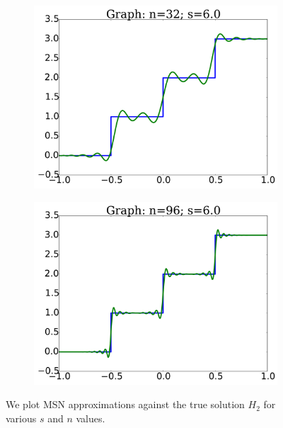 \begin{figure}[p]
    \begin{subfigure}{0.45\textwidth}
    \includegraphics[width=\textwidth]{plots/graph_n_32_s_6_heaviside_2.pdf}
    \end{subfigure}
    \begin{subfigure}{0.45\textwidth}
    \includegraphics[width=\textwidth]{plots/graph_n_96_s_6_heaviside_2.pdf}
    \end{subfigure}
\caption[Example Plots of MSN Interpolation of Rough Functions]{
We plot MSN approximations against the true solution $H_{2}$
for various $s$ and $n$ values.
}
\label{fig:msn_n_s_heaviside_2}
\end{figure}



